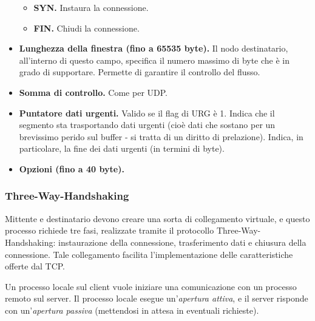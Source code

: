 \begin{itemize}
\begin{itemize}
                        \item 
                            \textbf{SYN.} Instaura la connessione.
                            
                        \item 
                            \textbf{FIN.} Chiudi la connessione.
                    \end{itemize}
                    
            \item 
                \textbf{Lunghezza della finestra (fino a 65535 byte).} Il nodo destinatario, all'interno di questo campo, specifica il numero massimo di byte che è in grado di supportare. Permette di garantire il controllo del flusso.
                
            \item
                \textbf{Somma di controllo.} Come per UDP.
                
            \item
                \textbf{Puntatore dati urgenti.} Valido se il flag di URG è 1. Indica che il segmento sta trasportando dati urgenti (cioè dati che sostano per un brevissimo perido sul buffer - si tratta di un diritto di prelazione). Indica, in particolare, la fine dei dati urgenti (in termini di byte).
                
            \item
                \textbf{Opzioni (fino a 40 byte).}
        \end{itemize}
        
    \subsubsection{Three-Way-Handshaking}
    
        Mittente e destinatario devono creare una sorta di collegamento virtuale, e questo processo richiede tre fasi, realizzate tramite il protocollo Three-Way-Handshaking: instaurazione della connessione, trasferimento dati e chiusura della connessione. Tale collegamento facilita l'implementazione delle caratteristiche offerte dal TCP. 
        
        
            Un processo locale sul client vuole iniziare una comunicazione con un processo remoto sul server. Il processo locale esegue un'\textit{apertura attiva}, e il server risponde con un'\textit{apertura passiva} (mettendosi in attesa in eventuali richieste).
                
